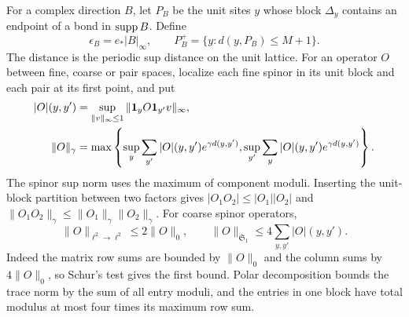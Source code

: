 For a complex direction $B$, let $P_B$ be the unit sites
$y$ whose block $\Delta_y$ contains an endpoint of a bond
in $\operatorname{supp} B$. Define
\[
 \epsilon_B=e_*|B|_\infty,\qquad
 P_B^+=\{y:d(y,P_B)\le M+1\}.
\]
The distance is the periodic sup distance on the unit
lattice. For an operator $O$ between fine, coarse or
pair spaces, localize each fine spinor in its unit
block and each pair at its first point, and put
\begin{align}
 |O|(y,y')&=\sup_{\|v\|_\infty\le1}
                         \|\mathbf1_yO\mathbf1_{y'}v\|_\infty,\notag\\
 \|O\|_\gamma&=\max\left\{
       \sup_y\sum_{y'}|O|(y,y')e^{\gamma d(y,y')},
       \sup_{y'}\sum_y|O|(y,y')e^{\gamma d(y,y')}\right\}.
                                  \label{eq:interacting-operator-majorants}
\end{align}
The spinor sup norm uses the maximum of component
moduli. Inserting the unit-block partition between
two factors gives
$|O_1O_2|\le|O_1||O_2|$ and
$\|O_1O_2\|_\gamma\le\|O_1\|_\gamma\|O_2\|_\gamma$.
For coarse spinor operators,
\begin{equation}\label{eq:interacting-matrix-norms}
 \|O\|_{\ell^2\to\ell^2}\le2\|O\|_0,\qquad
 \|O\|_{\mathfrak S_1}\le4\sum_{y,y'}|O|(y,y').
\end{equation}
Indeed the matrix row sums are bounded by $\|O\|_0$
and the column sums by $4\|O\|_0$, so Schur's test
gives the first bound. Polar decomposition bounds
the trace norm by the sum of all entry moduli, and
the entries in one block have total modulus at most
four times its maximum row sum.

